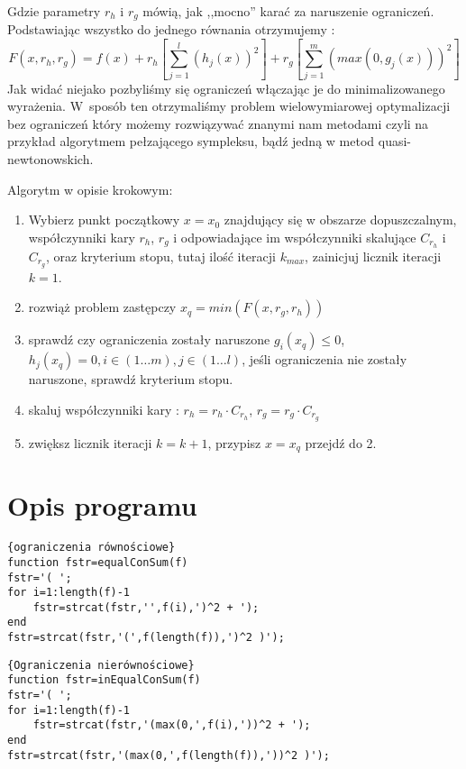 \documentclass{classrep}
\begin{document}
Gdzie parametry $r_h$ i $r_g$ mówią, jak ,,mocno'' karać za naruszenie ograniczeń. Podstawiając wszystko do jednego równania otrzymujemy :
\begin{equation}
 F(x,r_h, r_g) = f(x) + r_h \left[ \sum \limits ^{l} _{j=1} (h_j(x))^{2} \right]  + r_g \left[ \sum \limits ^{m} _{j=1}
 \left( max \left( 0, g_j (x) \right) \right) ^{2} \right]
\end{equation}
Jak widać niejako pozbyliśmy się ograniczeń włączając je do minimalizowanego wyrażenia. W~sposób ten otrzymaliśmy problem wielowymiarowej optymalizacji bez ograniczeń który możemy rozwiązywać znanymi nam metodami czyli na przykład algorytmem pełzającego sympleksu, bądź jedną w metod quasi-newtonowskich.

Algorytm w opisie krokowym:
\begin{enumerate}
\item Wybierz punkt początkowy $x=x_0$ znajdujący się w obszarze dopuszczalnym, współczynniki kary $r_h$, $r_g$ i odpowiadające im współczynniki skalujące $C_{r_h}$ i $C_{r_g}$, oraz kryterium stopu, tutaj ilość iteracji $k_{max}$, zainicjuj licznik iteracji $k=1$.
\item rozwiąż problem zastępczy   $x_q = min \left( F(x,r_g, r_h) \right)$
\item sprawdź czy ograniczenia zostały naruszone $g_i(x_q)\leq0$, $h_j(x_q)=0, i \in \left(1 \dots m \right) , j \in \left(1 \dots l \right)$, jeśli ograniczenia nie zostały naruszone, sprawdź kryterium stopu.
\item skaluj współczynniki kary : $r_h=r_h \cdot C_{r_h}$, $r_g=r_g \cdot C_{r_g}$
\item zwiększ licznik iteracji $k=k+1$, przypisz $x=x_q$ przejdź do 2.
\end{enumerate}

\section{Opis programu}

\begin{lstlisting}{ograniczenia równościowe}
function fstr=equalConSum(f)
fstr='( ';
for i=1:length(f)-1
    fstr=strcat(fstr,'',f(i),')^2 + ');
end
fstr=strcat(fstr,'(',f(length(f)),')^2 )');
\end{lstlisting}


\begin{lstlisting}{Ograniczenia nierównościowe}
function fstr=inEqualConSum(f)
fstr='( ';
for i=1:length(f)-1
    fstr=strcat(fstr,'(max(0,',f(i),'))^2 + ');
end
fstr=strcat(fstr,'(max(0,',f(length(f)),'))^2 )');
\end{lstlisting}
\end{document}
